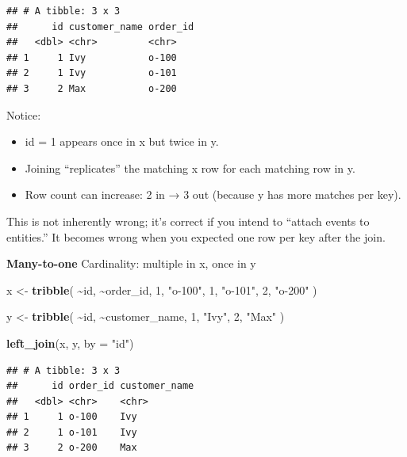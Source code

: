 \documentclass[
  11pt,
]{article}
\newenvironment{Shaded}{\begin{snugshade}}{\end{snugshade}}
\newcommand{\AttributeTok}[1]{\textcolor[rgb]{0.13,0.29,0.53}{#1}}
\newcommand{\DecValTok}[1]{\textcolor[rgb]{0.00,0.00,0.81}{#1}}
\newcommand{\FunctionTok}[1]{\textcolor[rgb]{0.13,0.29,0.53}{\textbf{#1}}}
\newcommand{\NormalTok}[1]{#1}
\newcommand{\OtherTok}[1]{\textcolor[rgb]{0.56,0.35,0.01}{#1}}
\newcommand{\SpecialCharTok}[1]{\textcolor[rgb]{0.81,0.36,0.00}{\textbf{#1}}}
\newcommand{\StringTok}[1]{\textcolor[rgb]{0.31,0.60,0.02}{#1}}
\providecommand{\tightlist}{%
  \setlength{\itemsep}{0pt}\setlength{\parskip}{0pt}}
\begin{document}
\begin{verbatim}
## # A tibble: 3 x 3
##      id customer_name order_id
##   <dbl> <chr>         <chr>   
## 1     1 Ivy           o-100   
## 2     1 Ivy           o-101   
## 3     2 Max           o-200
\end{verbatim}

Notice:

\begin{itemize}
\tightlist
\item
  id = 1 appears once in x but twice in y.
\item
  Joining ``replicates'' the matching x row for each matching row in y.
\item
  Row count can increase: 2 in → 3 out (because y has more matches per
  key).
\end{itemize}

This is not inherently wrong; it's correct if you intend to ``attach
events to entities.'' It becomes wrong when you expected one row per key
after the join.

\textbf{Many-to-one} Cardinality: multiple in x, once in y

\begin{Shaded}
\begin{Highlighting}[]
\NormalTok{x }\OtherTok{\textless{}{-}} \FunctionTok{tribble}\NormalTok{(}
  \SpecialCharTok{\textasciitilde{}}\NormalTok{id, }\SpecialCharTok{\textasciitilde{}}\NormalTok{order\_id,}
   \DecValTok{1}\NormalTok{,  }\StringTok{"o{-}100"}\NormalTok{,}
   \DecValTok{1}\NormalTok{,  }\StringTok{"o{-}101"}\NormalTok{,}
   \DecValTok{2}\NormalTok{,  }\StringTok{"o{-}200"}
\NormalTok{)}

\NormalTok{y }\OtherTok{\textless{}{-}} \FunctionTok{tribble}\NormalTok{(}
  \SpecialCharTok{\textasciitilde{}}\NormalTok{id, }\SpecialCharTok{\textasciitilde{}}\NormalTok{customer\_name,}
   \DecValTok{1}\NormalTok{,  }\StringTok{"Ivy"}\NormalTok{,}
   \DecValTok{2}\NormalTok{,  }\StringTok{"Max"}
\NormalTok{)}

\FunctionTok{left\_join}\NormalTok{(x, y, }\AttributeTok{by =} \StringTok{"id"}\NormalTok{)}
\end{Highlighting}
\end{Shaded}

\begin{verbatim}
## # A tibble: 3 x 3
##      id order_id customer_name
##   <dbl> <chr>    <chr>        
## 1     1 o-100    Ivy          
## 2     1 o-101    Ivy          
## 3     2 o-200    Max
\end{verbatim}
\end{document}
